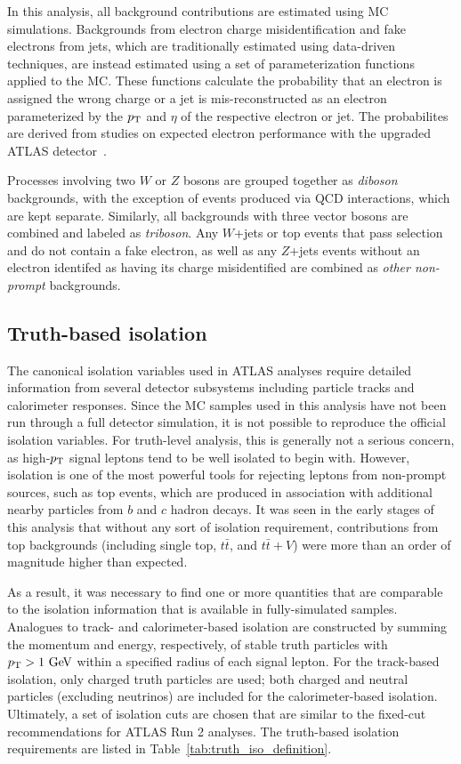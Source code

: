 In this analysis, all background contributions are estimated using MC simulations.
Backgrounds from electron charge misidentification and fake electrons from jets, which are traditionally estimated using data-driven techniques, are instead estimated using a set of parameterization functions applied to the MC.
These functions calculate the probability that an electron is assigned the wrong charge or a jet is mis-reconstructed as an electron parameterized by the $p_{\mathrm{T}}$ and $\eta$ of the respective electron or jet.
The probabilites are derived from studies on expected electron performance with the upgraded ATLAS detector~\cite{2016.upgrade-electron-performance}.

Processes involving two $W$ or $Z$ bosons are grouped together as \emph{diboson} backgrounds, with the exception of \ssww events produced via QCD interactions, which are kept separate.
Similarly, all backgrounds with three vector bosons are combined and labeled as \emph{triboson}.
Any $W$+jets or top events that pass selection and do not contain a fake electron, as well as any $Z$+jets events without an electron identifed as having its charge misidentified are combined as \emph{other non-prompt} backgrounds.

\subsection{Truth-based isolation}\label{sswwupgrade:isolation}
The canonical isolation variables used in ATLAS analyses require detailed information from several detector subsystems including particle tracks and calorimeter responses.
Since the MC samples used in this analysis have not been run through a full detector simulation, it is not possible to reproduce the official isolation variables.
For truth-level analysis, this is generally not a serious concern, as high-$p_{\mathrm{T}}$ signal leptons tend to be well isolated to begin with.
However, isolation is one of the most powerful tools for rejecting leptons from non-prompt sources, such as top events, which are produced in association with additional nearby particles from $b$ and $c$ hadron decays.
It was seen in the early stages of this analysis that without any sort of isolation requirement, contributions from top backgrounds (including single top, $t\bar{t}$, and $t\bar{t}+V$) were more than an order of magnitude higher than expected.%

As a result, it was necessary to find one or more quantities that are comparable to the isolation information that is available in fully-simulated samples.
Analogues to track- and calorimeter-based isolation are constructed by summing the momentum and energy, respectively, of stable truth particles with $\pt > 1\gev$ within a specified radius of each signal lepton.
For the track-based isolation, only charged truth particles are used; both charged and neutral particles (excluding neutrinos) are included for the calorimeter-based isolation.
Ultimately, a set of isolation cuts are chosen that are similar to the fixed-cut recommendations for ATLAS Run 2 analyses.
The truth-based isolation requirements are listed in Table~\ref{tab:truth_iso_definition}.

